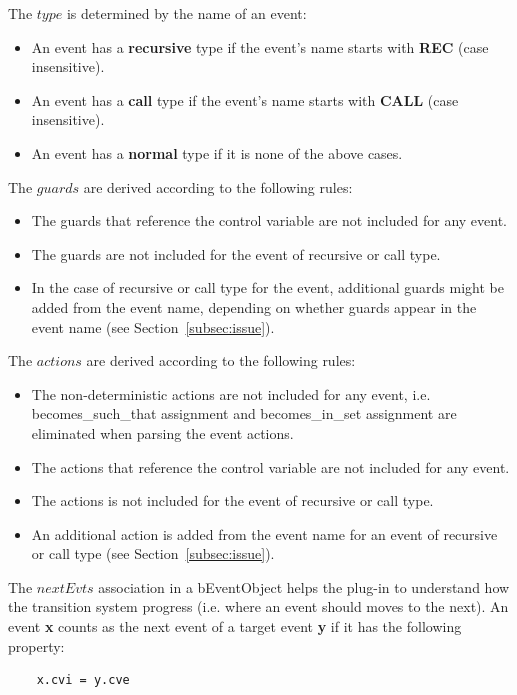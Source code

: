 \documentclass{easychair}
\begin{document}
The $type$ is determined by the name of an event:
\begin{itemize}
	\item An event has a \textbf{recursive} type if the event's name starts with \textbf{REC} (case insensitive).
	\item An event has a \textbf{call} type if the event's name starts with \textbf{CALL} (case insensitive).
	\item An event has a \textbf{normal} type if it is none of the above cases.
\end{itemize}

The $guards$ are derived according to the following rules:
\begin{itemize}
	\item The guards that reference the control variable are not included for any event.
	\item The guards are not included for the event of recursive or call type.
	\item In the case of recursive or call type for the event, additional guards might be added from the event name, depending on whether guards appear in the event name (see Section~\ref{subsec:issue}).  
\end{itemize}

The $actions$ are derived according to the following rules:
\begin{itemize}
	\item The non-deterministic actions are not included for any event, i.e. becomes\_such\_that assignment and becomes\_in\_set assignment are eliminated when parsing the event actions.
	\item The actions that reference the control variable are not included for any event.
	\item The actions is not included for the event of recursive or call type.
	\item An additional action is added from the event name for an event of recursive or call type (see Section~\ref{subsec:issue}).  
\end{itemize}

The $nextEvts$ association in a bEventObject helps the plug-in to understand how the transition system progress (i.e. where an event should moves to the next). An event \textbf{x} counts as the next event of a target event \textbf{y} if it has the following property:
\begin{lstlisting}
	x.cvi = y.cve
\end{lstlisting}
\end{document}
